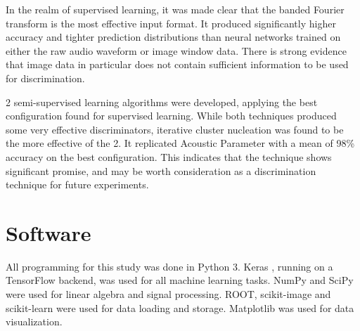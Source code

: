 \documentclass[10pt]{article}
\begin{document}
In the realm of supervised learning, it was made clear that the banded Fourier transform is the most effective input format. It produced significantly higher accuracy and tighter prediction distributions than neural networks trained on either the raw audio waveform or image window data. There is strong evidence that image data in particular does not contain sufficient information to be used for discrimination.

2 semi-supervised learning algorithms were developed, applying the best configuration found for supervised learning. While both techniques produced some very effective discriminators, iterative cluster nucleation was found to be the more effective of the 2. It replicated Acoustic Parameter with a mean of 98\% accuracy on the best configuration. This indicates that the technique shows significant promise, and may be worth consideration as a discrimination technique for future experiments.

\section{Software}

All programming for this study was done in Python 3. Keras \cite{keras}, running on a TensorFlow backend, was used for all machine learning tasks. NumPy and SciPy were used for linear algebra and signal processing. ROOT, scikit-image and scikit-learn were used for data loading and storage. Matplotlib was used for data visualization.

\printbibliography
\end{document}

